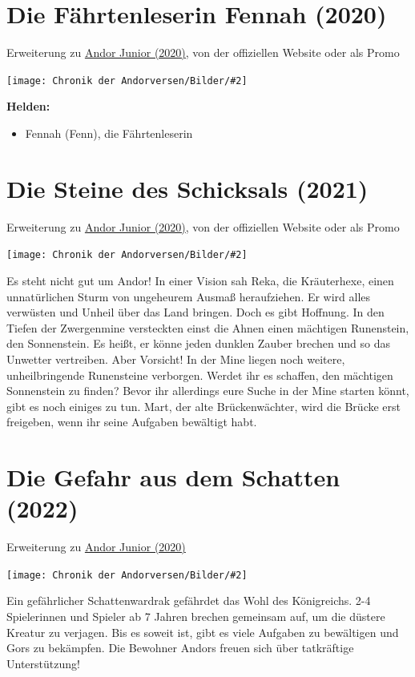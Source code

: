 \documentclass[10pt, a4paper, oneside]{book}
\newcommand{\fillbreak}{\vspace*{\fill}\columnbreak}
\newcommand{\produkt}[1]{%
    \section{#1}%
    \label{Produkt: #1}%
}
\newcommand{\refprodukt}[1]{\hyperref[Produkt: #1]{#1}}
\newcommand{\bildmitts}[2][height=0.32\textwidth,width=0.48\textwidth,keepaspectratio]{%
    \begin{center}
        \texttt{[image: Chronik der Andorversen/Bilder/\#2]}
    \end{center}
}
\begin{document}
\begin{multicols}{2}
\fillbreak
\produkt{Die Fährtenleserin Fennah (2020)}

\begin{center}
    Erweiterung zu \refprodukt{Andor Junior (2020)}, von der offiziellen Website oder als Promo
\end{center}

\bildmitts{Andor Junior Fennah.jpeg}

\textbf{Helden:} 
\begin{itemize}[topsep=0pt,itemsep=-1ex,partopsep=1ex,parsep=1ex]
    \item Fennah (Fenn), die Fährtenleserin 
\end{itemize}



\produkt{Die Steine des Schicksals (2021)}

\begin{center}
    Erweiterung zu \refprodukt{Andor Junior (2020)}, von der offiziellen Website oder als Promo
\end{center}

\bildmitts{Die Steine des Schicksals Promo (2024).jpg}

Es steht nicht gut um Andor! In einer Vision sah Reka, die Kräuterhexe, einen unnatürlichen Sturm von ungeheurem Ausmaß heraufziehen. Er wird alles verwüsten und Unheil über das Land bringen. Doch es gibt Hoffnung. In den Tiefen der Zwergenmine versteckten einst die Ahnen einen mächtigen Runenstein, den Sonnenstein. Es heißt, er könne jeden dunklen Zauber brechen und so das Unwetter vertreiben. Aber Vorsicht! In der Mine liegen noch weitere, unheilbringende Runensteine verborgen. Werdet ihr es schaffen, den mächtigen Sonnenstein zu finden? Bevor ihr allerdings eure Suche in der Mine starten könnt, gibt es noch einiges zu tun. Mart, der alte Brückenwächter, wird die Brücke erst freigeben, wenn ihr seine Aufgaben bewältigt habt.


  
\fillbreak
\produkt{Die Gefahr aus dem Schatten (2022)}

\begin{center}
    Erweiterung zu \refprodukt{Andor Junior (2020)}
\end{center}

\bildmitts{Die Gefahr aus dem Schatten (2022).png}

Ein gefährlicher Schattenwardrak gefährdet das Wohl des Königreichs. 2-4 Spielerinnen und Spieler ab 7 Jahren brechen gemeinsam auf, um die düstere Kreatur zu verjagen. Bis es soweit ist, gibt es viele Aufgaben zu bewältigen und Gors zu bekämpfen. Die Bewohner Andors freuen sich über tatkräftige Unterstützung!\bigskip


\end{multicols}
\end{document}
